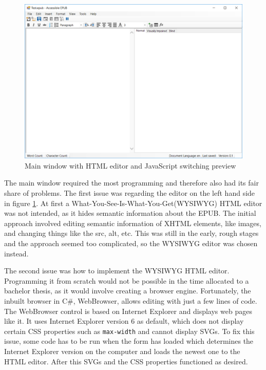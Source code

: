 \begin{figure}
	\includegraphics[width=\linewidth]{figures/formJs.png}	
	\caption{Main window with HTML editor and JavaScript switching preview}
	\label{fig:formJs}
\end{figure}

The main window required the most programming and therefore also had its fair share of problems. The first issue was regarding the editor on the left hand side in figure \ref{fig:formJs}. At first a What-You-See-Is-What-You-Get(WYSIWYG) HTML editor was not intended, as it hides semantic information about the EPUB. The initial approach involved editing semantic information of XHTML elements, like images, and changing things like the src, alt, etc. This was still in the early, rough stages and the approach seemed too complicated, so the WYSIWYG editor was chosen instead. 

The second issue was how to implement the WYSIWYG HTML editor. Programming it from scratch would not be possible in the time allocated to a bachelor thesis, as it would involve creating a browser engine. Fortunately, the inbuilt browser in C\#, WebBrowser, allows editing with just a few lines of code. The WebBrowser control is based on Internet Explorer and displays web pages like it. It uses Internet Explorer version 6 as default, which does not display certain CSS properties such as \lstinline|max-width| and cannot display SVGs. To fix this issue, some code has to be run when the form has loaded which determines the Internet Explorer version on the computer and loads the newest one to the HTML editor. After this SVGs and the CSS properties functioned as desired. 

